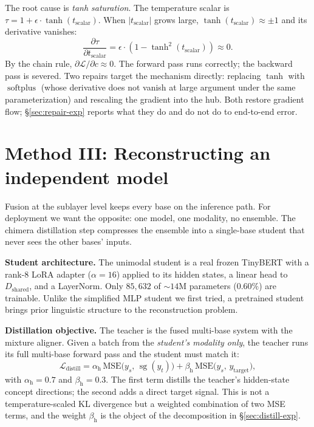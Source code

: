 \documentclass[10pt,twoside]{article}
\newcommand{\stopgrad}{\operatorname{sg}}
\newcommand{\softplus}{\operatorname{softplus}}
\theoremstyle{definition}
\theoremstyle{plain}
\theoremstyle{remark}
\begin{document}
The root cause is \emph{tanh saturation}. The temperature scalar is $\tau = 1 + \epsilon \cdot \tanh(t_{\text{scalar}})$. When $|t_{\text{scalar}}|$ grows large, $\tanh(t_{\text{scalar}}) \approx \pm 1$ and its derivative vanishes:
\begin{equation}
\frac{\partial \tau}{\partial t_{\text{scalar}}} = \epsilon \cdot (1 - \tanh^2(t_{\text{scalar}})) \approx 0 .
\end{equation}
By the chain rule, $\partial \mathcal{L}/\partial c \approx 0$. The forward pass runs correctly; the backward pass is severed. Two repairs target the mechanism directly: replacing $\tanh$ with $\softplus$ (whose derivative does not vanish at large argument under the same parameterization) and rescaling the gradient into the hub. Both restore gradient flow; \S\ref{sec:repair-exp} reports what they do and do not do to end-to-end error.

\section{Method III: Reconstructing an independent model}
\label{sec:distill}

Fusion at the sublayer level keeps every base on the inference path. For deployment we want the opposite: one model, one modality, no ensemble. The chimera distillation step compresses the ensemble into a single-base student that never sees the other bases' inputs.

\textbf{Student architecture.} The unimodal student is a real frozen TinyBERT \citep{jiao2020} with a rank-8 LoRA adapter ($\alpha{=}16$) applied to its hidden states, a linear head to $D_{\text{shared}}$, and a LayerNorm. Only $85{,}632$ of ${\sim}14$M parameters ($0.60\%$) are trainable. Unlike the simplified MLP student we first tried, a pretrained student brings prior linguistic structure to the reconstruction problem.

\textbf{Distillation objective.} The teacher is the fused multi-base system with the mixture aligner. Given a batch from the \emph{student's modality only}, the teacher runs its full multi-base forward pass and the student must match it:
\begin{equation}
\label{eq:distill}
\mathcal{L}_{\text{distill}} = \alpha_{\text{h}} \, \mathrm{MSE}\big(y_s,\, \stopgrad(y_t)\big) + \beta_{\text{h}} \, \mathrm{MSE}\big(y_s,\, y_{\text{target}}\big),
\end{equation}
with $\alpha_{\text{h}} = 0.7$ and $\beta_{\text{h}} = 0.3$. The first term distills the teacher's hidden-state concept directions; the second adds a direct target signal. This is not a temperature-scaled KL divergence but a weighted combination of two MSE terms, and the weight $\beta_{\text{h}}$ is the object of the decomposition in \S\ref{sec:distill-exp}.
\end{document}
